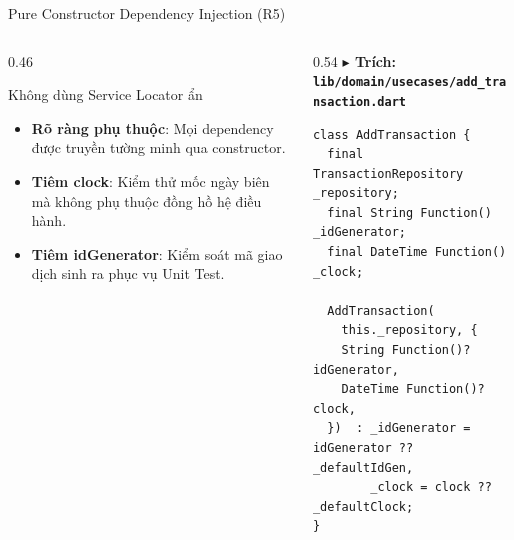 \documentclass[aspectratio=169, 10pt]{beamer}
\newcommand{\speakerB}{\hfill\tcbox[colback=NavyPrimary,colframe=NavyPrimary,boxsep=1pt,left=3pt,right=3pt,top=1pt,bottom=1pt]{\tiny\bfseries\color{white}SV B: Phạm Nhung}}
\begin{document}
\begin{frame}[fragile]{Pure Constructor Dependency Injection (R5) \speakerB}
  \begin{columns}[c]
    \begin{column}{0.46\textwidth}
      \begin{infobox}[IndigoAccent]{Không dùng Service Locator ẩn}
        \begin{itemize}\setlength{\itemsep}{3pt}\scriptsize
          \item \textbf{Rõ ràng phụ thuộc}: Mọi dependency được truyền tường minh qua constructor.
          \item \textbf{Tiêm clock}: Kiểm thử mốc ngày biên mà không phụ thuộc đồng hồ hệ điều hành.
          \item \textbf{Tiêm idGenerator}: Kiểm soát mã giao dịch sinh ra phục vụ Unit Test.
        \end{itemize}
      \end{infobox}
    \end{column}

    \begin{column}{0.54\textwidth}
\vspace{1mm}
{\scriptsize\bfseries\color{NavyPrimary} $\blacktriangleright$ Trích: \texttt{lib/domain/usecases/add_transaction.dart}}\\[1mm]
\begin{lstlisting}
class AddTransaction {
  final TransactionRepository _repository;
  final String Function() _idGenerator;
  final DateTime Function() _clock;

  AddTransaction(
    this._repository, {
    String Function()? idGenerator,
    DateTime Function()? clock,
  })  : _idGenerator = idGenerator ?? _defaultIdGen,
        _clock = clock ?? _defaultClock;
}
\end{lstlisting}
    \end{column}
  \end{columns}
\end{frame}
\end{document}
